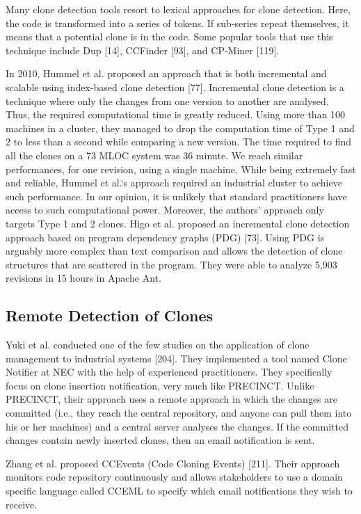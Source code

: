 \documentclass[12pt]{report}
\begin{document}
Many clone detection tools resort to lexical approaches for clone
detection. Here, the code is transformed into a series of tokens. If
sub-series repeat themselves, it means that a potential clone is in the
code. Some popular tools that use this technique include Dup {[}14{]},
CCFinder {[}93{]}, and CP-Miner {[}119{]}.

In 2010, Hummel et al. proposed an approach that is both incremental and
scalable using index-based clone detection {[}77{]}. Incremental clone
detection is a technique where only the changes from one version to
another are analysed. Thus, the required computational time is greatly
reduced. Using more than 100 machines in a cluster, they managed to drop
the computation time of Type 1 and 2 to less than a second while
comparing a new version. The time required to find all the clones on a
73 MLOC system was 36 minute. We reach similar performances, for one
revision, using a single machine. While being extremely fast and
reliable, Hummel et al.`s approach required an industrial cluster to
achieve such performance. In our opinion, it is unlikely that standard
practitioners have access to such computational power. Moreover, the
authors' approach only targets Type 1 and 2 clones. Higo et al. proposed
an incremental clone detection approach based on program dependency
graphs (PDG) {[}73{]}. Using PDG is arguably more complex than text
comparison and allows the detection of clone structures that are
scattered in the program. They were able to analyze 5,903 revisions in
15 hours in Apache Ant.

\subsection{Remote Detection of
Clones}\label{remote-detection-of-clones}

Yuki et al. conducted one of the few studies on the application of clone
management to industrial systems {[}204{]}. They implemented a tool
named Clone Notifier at NEC with the help of experienced practitioners.
They specifically focus on clone insertion notification, very much like
PRECINCT. Unlike PRECINCT, their approach uses a remote approach in
which the changes are committed (i.e., they reach the central
repository, and anyone can pull them into his or her machines) and a
central server analyses the changes. If the committed changes contain
newly inserted clones, then an email notification is sent.

Zhang et al. proposed CCEvents (Code Cloning Events) {[}211{]}. Their
approach monitors code repository continuously and allows stakeholders
to use a domain specific language called CCEML to specify which email
notifications they wish to receive.
\end{document}

